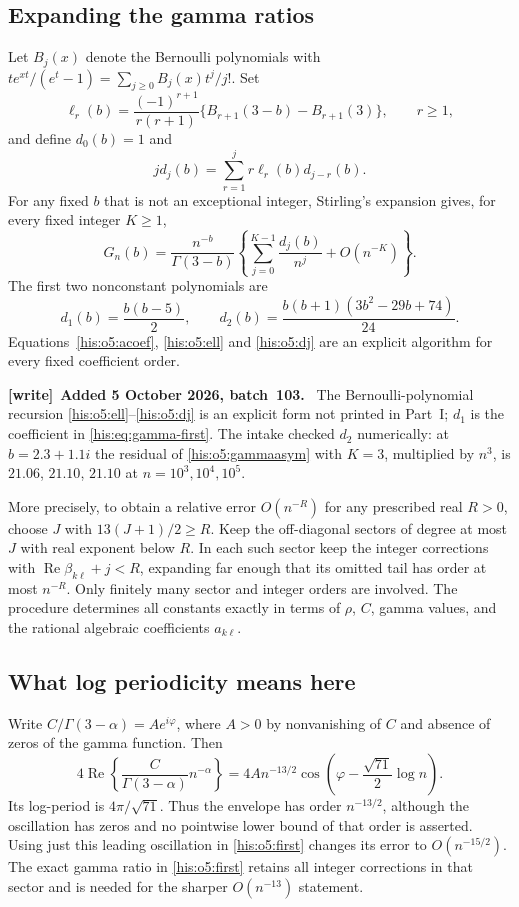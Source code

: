 \documentclass[11pt]{article}
\theoremstyle{remark}\newtheorem{remark}[theorem]{Remark}
\DeclareMathOperator{\Rea}{Re}
\numberwithin{equation}{section}
\newenvironment{writenote}[1][]{\par\smallskip\begingroup\small
 \noindent\textbf{[write]}\if\relax\detokenize{#1}\relax\else~\textbf{#1.}\fi\ }%
 {\par\endgroup\smallskip}
\begin{document}
\subsection{Expanding the gamma ratios}
Let $B_j(x)$ denote the Bernoulli polynomials with
$te^{xt}/(e^t-1)=\sum_{j\ge0}B_j(x)t^j/j!$. Set
\begin{equation}\label{his:o5:ell}
\ell_r(b)=\frac{(-1)^{r+1}}{r(r+1)}
\{B_{r+1}(3-b)-B_{r+1}(3)\},\qquad r\ge1,
\end{equation}
and define $d_0(b)=1$ and
\begin{equation}\label{his:o5:dj}
jd_j(b)=\sum_{r=1}^{j}r\ell_r(b)d_{j-r}(b).
\end{equation}
For any fixed $b$ that is not an exceptional integer, Stirling's expansion
gives, for every fixed integer $K\ge1$,
\begin{equation}\label{his:o5:gammaasym}
G_n(b)=\frac{n^{-b}}{\Gamma(3-b)}
\left\{\sum_{j=0}^{K-1}\frac{d_j(b)}{n^j}+O(n^{-K})\right\}.
\end{equation}
The first two nonconstant polynomials are
\[
d_1(b)=\frac{b(b-5)}2,\qquad
d_2(b)=\frac{b(b+1)(3b^2-29b+74)}{24}.
\]
Equations~\eqref{his:o5:acoef}, \eqref{his:o5:ell} and \eqref{his:o5:dj} are an explicit
algorithm for every fixed coefficient order.
\begin{writenote}[Added 5 October 2026, batch~103]
The Bernoulli-polynomial recursion \eqref{his:o5:ell}--\eqref{his:o5:dj} is an explicit form not printed in Part~I; $d_1$ is the coefficient in \eqref{his:eq:gamma-first}. The intake checked $d_2$ numerically: at $b=2.3+1.1i$ the residual of \eqref{his:o5:gammaasym} with $K=3$, multiplied by $n^3$, is $21.06$, $21.10$, $21.10$ at $n=10^3,10^4,10^5$.
\end{writenote}


More precisely, to obtain a relative error $O(n^{-R})$ for any prescribed
real $R>0$, choose $J$ with $13(J+1)/2\ge R$. Keep the off-diagonal sectors
of degree at most $J$ with real exponent below $R$. In each such sector
keep the integer corrections with $\Rea\beta_{k\ell}+j<R$, expanding
far enough that its omitted tail has order at most $n^{-R}$.
Only finitely many sector and integer orders are involved. The procedure
determines all constants exactly in terms of $\rho$, $C$, gamma values,
and the rational algebraic coefficients $a_{k\ell}$.

\subsection{What log periodicity means here}
Write $C/\Gamma(3-\alpha)=A e^{i\varphi}$, where $A>0$ by nonvanishing
of $C$ and absence of zeros of the gamma function. Then
\[
4\Rea\!\left\{\frac{C}{\Gamma(3-\alpha)}n^{-\alpha}\right\}
=4A n^{-13/2}\cos\!\left(\varphi-\frac{\sqrt{71}}2\log n\right).
\]
Its log-period is $4\pi/\sqrt{71}$.
Thus the envelope has order $n^{-13/2}$, although the oscillation has
zeros and no pointwise lower bound of that order is asserted.
Using just this leading oscillation in \eqref{his:o5:first} changes its error to
$O(n^{-15/2})$. The exact gamma ratio in \eqref{his:o5:first} retains all integer
corrections in that sector and is needed for the sharper $O(n^{-13})$
statement.
\end{document}
